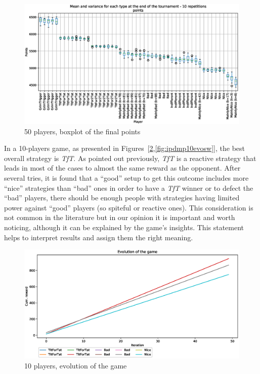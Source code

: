 \documentclass[journal,10pt,twoside]{IEEEtran}
\begin{document}
\begin{figure}[!ht]
    \centering
    \includegraphics[width=1\columnwidth]{../img/ipdmp/ipdmp-boxplot-final-points-50}
    \caption{50 players, boxplot of the final points}
    \label{fig:ipdmp50boxfinal}
\end{figure}

In a 10-players game, as presented in Figures~[\ref{fig:ipdmp10evo},\ref{fig:ipdmp10evosw}], the best overall strategy is \textit{TfT}. As pointed out previously, \textit{TfT} is a reactive strategy that leads in most of the cases to almost the same reward as the opponent. After several tries, it is found that a ``good'' setup to get this outcome includes more ``nice'' strategies than ``bad'' ones in order to have a \textit{TfT} winner or to defect the ``bad'' players, there should be enough people with strategies having limited power against ``good'' players (so spiteful or reactive ones). This consideration is not common in the literature but in our opinion it is important and worth noticing, although it can be explained by the game's insights. This statement helps to interpret results and assign them the right meaning.

\begin{figure}[!ht]
    \centering
    \includegraphics[width=1\columnwidth]{../img/ipdmp/ipdmp-evolution-of-game-10}
    \caption{10 players, evolution of the game}
    \label{fig:ipdmp10evo}
\end{figure}
\end{document}
